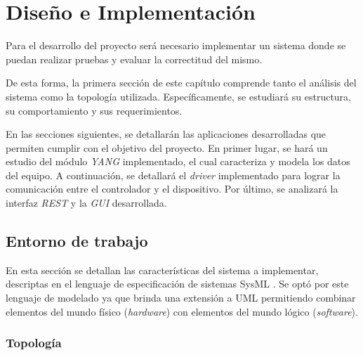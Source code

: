 
\chapter{Diseño e Implementación} %

\label{Chapter5} %
Para el desarrollo del proyecto será necesario implementar un sistema donde se puedan realizar pruebas y evaluar la correctitud del mismo. 

De esta forma, la primera sección de este capítulo comprende tanto el análisis del sistema como la topología utilizada. Específicamente, se estudiará su estructura, su comportamiento y sus requerimientos. 

En las secciones siguientes, se detallarán las aplicaciones desarrolladas que permiten cumplir con el objetivo del proyecto. En primer lugar, se hará un estudio del módulo \textit{YANG} implementado, el cual caracteriza y modela los datos del equipo. A continuación, se detallará el \textit{driver} implementado para lograr la comunicación entre el controlador y el dispositivo. Por último, se analizará la interfaz \textit{REST} y la \textit{GUI} desarrollada.


\section{Entorno de trabajo}
En esta sección se detallan las características del sistema a implementar, descriptas en el lenguaje de especificación de sistemas SysML \parencite{sysml}. Se optó por este lenguaje de modelado ya que brinda una extensión a UML permitiendo combinar elementos del mundo físico (\textit{hardware}) con elementos del mundo lógico (\textit{software}). 


\subsection{Topología}

